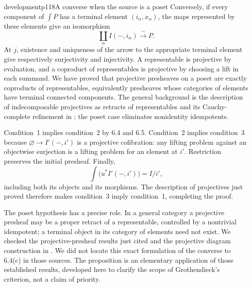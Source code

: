 \begin{dcomment}{development}{p118}{A converse when the source is a poset}
Conversely, if every component of $\int P$ has a terminal element $(i_\alpha,x_\alpha)$, the maps represented by these elements give an isomorphism
\[
 \coprod_\alpha I(-,i_\alpha)\xrightarrow{\ \sim\ }P.
\]
At $j$, existence and uniqueness of the arrow to the appropriate terminal element give respectively surjectivity and injectivity. A representable is projective by evaluation, and a coproduct of representables is projective by choosing a lift in each summand. We have proved that projective presheaves on a poset are exactly coproducts of representables, equivalently presheaves whose categories of elements have terminal connected components. The general background is the description of indecomposable projectives as retracts of representables and its Cauchy-complete refinement in \citet[Proposition~0.7 and Theorem~0.8]{vanOosten2021Topos}; the poset case eliminates nonidentity idempotents.

Condition~1 implies condition~2 by 6.4 and 6.5. Condition~2 implies condition~3 because $\varnothing\to I'(-,i')$ is a projective cofibration: any lifting problem against an objectwise surjection is a lifting problem for an element at $i'$. Restriction preserves the initial presheaf. Finally,
\[
 \int\bigl(u^*I'(-,i')\bigr)=I/i',
\]
including both its objects and its morphisms. The description of projectives just proved therefore makes condition~3 imply condition~1, completing the proof.

The poset hypothesis has a precise role. In a general category a projective presheaf may be a proper retract of a representable, controlled by a nontrivial idempotent; a terminal object in its category of elements need not exist. We checked the projective-presheaf results just cited and the projective diagram construction in \citet[\S12.3]{Riehl2014}. We did not locate this exact formulation of the converse to 6.4(c) in those sources. The proposition is an elementary application of those established results, developed here to clarify the scope of Grothendieck's criterion, not a claim of priority.
\end{dcomment}


